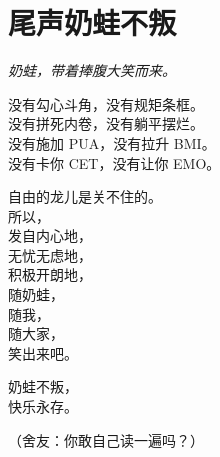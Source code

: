 
\clearpage
\section{尾声\quad 奶蛙不叛}
\begin{center}
\itshape
\fontsize{13}{24}\selectfont
奶蛙，带着捧腹大笑而来。\par
\vspace{16pt}
没有勾心斗角，没有规矩条框。\\
没有拼死内卷，没有躺平摆烂。\\
没有施加 PUA，没有拉升 BMI。\\
没有卡你 CET，没有让你 EMO。\par
\vspace{16pt}
自由的龙儿是关不住的。\\
所以，\\
发自内心地，\\
无忧无虑地，\\
积极开朗地，\\
随奶蛙，\\
随我，\\
随大家，\\
笑出来吧。\par
\vspace{16pt}
奶蛙不叛，\\
快乐永存。
\end{center}

\begin{flushright}
\small （舍友：你敢自己读一遍吗？）
\end{flushright}

